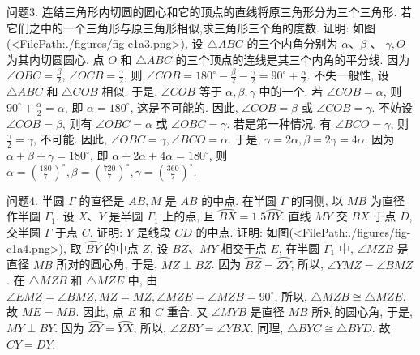 问题3. 连结三角形内切圆的圆心和它的顶点的直线将原三角形分为三个三角形.
若它们之中的一个三角形与原三角形相似,求三角形三个角的度数.
证明: 如图(<FilePath:./figures/fig-c1a3.png>), 设 $\triangle A B C$ 的三个内角分别为 $\alpha 、 \beta$ 、 $\gamma, O$ 为其内切圆圆心.
点 $O$ 和 $\triangle A B C$ 的三个顶点的连线是其三个内角的平分线.
因为 $\angle O B C=\frac{\beta}{2}$, $\angle O C B=\frac{\gamma}{2}$, 则 $\angle C O B=180^{\circ}-\frac{\beta}{2}-\frac{\gamma}{2}=90^{\circ}+\frac{\alpha}{2}$. 不失一般性, 设 $\triangle A B C$ 和 $\triangle C O B$ 相似.
于是, $\angle C O B$ 等于 $\alpha, \beta, \gamma$ 中的一个.
若 $\angle C O B=\alpha$, 则 $90^{\circ}+\frac{\alpha}{2}=\alpha$, 即
$\alpha=180^{\circ}$, 这是不可能的.
因此, $\angle C O B=\beta$ 或 $\angle C O B=\gamma$. 不妨设 $\angle C O B=\beta$, 则有 $\angle O B C=\alpha$ 或 $\angle O B C=\gamma$. 若是第一种情况, 有 $\angle B C O=\gamma$, 则 $\frac{\gamma}{2}=\gamma$, 不可能.
因此, $\angle O B C=\gamma, \angle B C O=\alpha$. 于是, $\gamma=2 \alpha, \beta=2 \gamma=4 \alpha$. 因为 $\alpha+\beta+\gamma= 180^{\circ}$, 即 $\alpha+2 \alpha+4 \alpha=180^{\circ}$, 则 $\alpha=\left(\frac{180}{7}\right)^{\circ}, \beta=\left(\frac{720}{7}\right)^{\circ}, \gamma=\left(\frac{360}{7}\right)^{\circ}$.



问题4. 半圆 $\Gamma$ 的直径是 $A B, M$ 是 $A B$ 的中点.
在半圆 $\Gamma$ 的同侧, 以 $M B$ 为直径作半圆 $\Gamma_1$. 设 $X 、 Y$ 是半圆 $\Gamma_1$ 上的点, 且 $\overparen{B X}=1.5 \overparen{B Y}$. 直线 $M Y$ 交 $B X$ 于点 $D$, 交半圆 $\Gamma$ 于点 $C$. 证明: $Y$ 是线段 $C D$ 的中点.
证明: 如图(<FilePath:./figures/fig-c1a4.png>), 取 $\overparen{B Y}$ 的中点 $Z$, 设 $B Z 、 M Y$ 相交于点 $E$, 在半圆 $\Gamma_1$ 中, $\angle M Z B$ 是直径 $M B$ 所对的圆心角, 于是, $M Z \perp B Z$. 因为 $\overparen{B Z}=\overparen{Z Y}$, 所以, $\angle Y M Z=\angle B M Z$. 在 $\triangle M Z B$ 和 $\triangle M Z E$ 中, 由 $\angle E M Z=\angle B M Z, M Z=M Z, \angle M Z E=\angle M Z B=90^{\circ}$, 所以, $\triangle M Z B \cong \triangle M Z E$. 故 $M E=M B$. 因此, 点 $E$ 和 $C$ 重合.
又 $\angle M Y B$ 是直径 $M B$ 所对的圆心角, 于是, $M Y \perp B Y$. 因为 $\overparen{Z Y}=\overparen{Y X}$, 所以, $\angle Z B Y=\angle Y B X$. 同理, $\triangle B Y C \cong \triangle B Y D$. 故 $C Y=D Y$.




